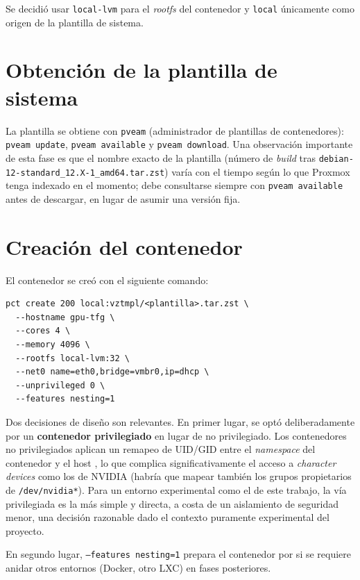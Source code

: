 Se decidió usar \texttt{local-lvm} para el \textit{rootfs} del contenedor y \texttt{local} únicamente como origen de la plantilla de sistema.

\section{Obtención de la plantilla de sistema}

La plantilla se obtiene con \texttt{pveam} (administrador de plantillas de contenedores): \texttt{pveam update}, \texttt{pveam available} y \texttt{pveam download}. Una observación importante de esta fase es que el nombre exacto de la plantilla (número de \textit{build} tras \texttt{debian-12-standard\_12.X-1\_amd64.tar.zst}) varía con el tiempo según lo que Proxmox tenga indexado en el momento; debe consultarse siempre con \texttt{pveam available} antes de descargar, en lugar de asumir una versión fija.

\section{Creación del contenedor}

El contenedor se creó con el siguiente comando:

\begin{lstlisting}[style=bash]
pct create 200 local:vztmpl/<plantilla>.tar.zst \
  --hostname gpu-tfg \
  --cores 4 \
  --memory 4096 \
  --rootfs local-lvm:32 \
  --net0 name=eth0,bridge=vmbr0,ip=dhcp \
  --unprivileged 0 \
  --features nesting=1
\end{lstlisting}

Dos decisiones de diseño son relevantes. En primer lugar, se optó deliberadamente por un \textbf{contenedor privilegiado} en lugar de no privilegiado. Los contenedores no privilegiados aplican un remapeo de UID/GID entre el \textit{namespace} del contenedor y el host \cite{lxc_security,lxc_containers_conf}, lo que complica significativamente el acceso a \textit{character devices} como los de NVIDIA (habría que mapear también los grupos propietarios de \texttt{/dev/nvidia*}). Para un entorno experimental como el de este trabajo, la vía privilegiada es la más simple y directa, a costa de un aislamiento de seguridad menor, una decisión razonable dado el contexto puramente experimental del proyecto.

En segundo lugar, \texttt{--features nesting=1} prepara el contenedor por si se requiere anidar otros entornos (Docker, otro LXC) en fases posteriores.

